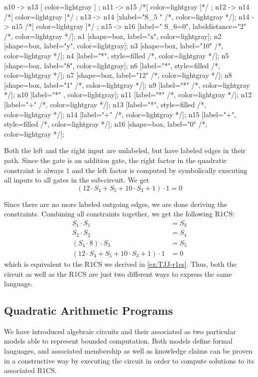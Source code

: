 \begin{example}
\begin{center}
{	n10 -> n13 [ color=lightgray ] ; 
	n11 -> n15 /*[ color=lightgray ]*/ ;
	n12 -> n14 /*[ color=lightgray ]*/ ;	
	n13 -> n14 [xlabel="S_5  "  /*, color=lightgray */];
	n14 -> n15 /*[ color=lightgray ]*/ ;
	n15 -> n16 [label="  S_6=0", labeldistance="2" /*, color=lightgray */];
	n1 [shape=box, label="x", color=lightgray];
	n2 [shape=box, label="y", color=lightgray];
	n3 [shape=box, label="10" /*, color=lightgray */];
	n4 [label="*", style=filled /*, color=lightgray */];
	n5 [shape=box, label="8", color=lightgray];
	n6 [label="*", style=filled /*, color=lightgray */];
	n7 [shape=box, label="12" /*, color=lightgray */];
	n8 [shape=box, label="1" /*, color=lightgray */];
	n9 [label="*" /*, color=lightgray */];
	n10 [label="*" , color=lightgray];
	n11 [label="*" /*, color=lightgray */];	
	n12 [label="+" /*, color=lightgray */];	
	n13 [label="*", style=filled /*, color=lightgray */];
	n14 [label="+" /*, color=lightgray */];
	n15 [label="+", style=filled /*, color=lightgray */];
	n16 [shape=box, label="0" /*, color=lightgray */];		
}
\end{center}
Both the left and the right input are  unlabeled, but have labeled edges in their path. Since the gate is an addition gate, the right factor in the quadratic constraint is always $1$ and the left factor is computed by symbolically executing all inputs to all gates in the sub-circuit. We get
$$
(12\cdot S_4 + S_5 + 10\cdot S_3 + 1)\cdot 1 = 0
$$

Since there are no more labeled outgoing edges, we are done deriving the constraints. Combining all constraints together, we get the following R1CS:
\begin{align*}
 S_1 \cdot S_1 &= S_3\\
 S_2 \cdot S_2 &= S_4\\
 (S_4\cdot 8)\cdot S_3 &= S_5\\
 (12\cdot S_4 + S_5 + 10\cdot S_3 + 1)\cdot 1 &= 0
\end{align*}
which is equivalent to the R1CS we derived in \examplename{} \ref{ex:TJJ-r1cs}. Thus, both the circuit as well as the R1CS are just two different ways to express the same language.
\end{example}
\subsection{Quadratic Arithmetic Programs}
\label{sec:QAP}
 We have introduced algebraic circuits and their associated  as two particular models able to represent bounded computation. Both models define formal languages, and associated membership as well as knowledge claims can be proven in a constructive way by executing the circuit in order to compute solutions to its associated R1CS. 

